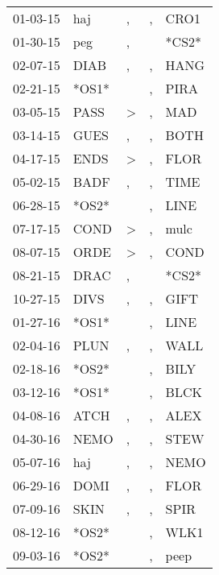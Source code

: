 \begin{supertabular}{lllll}
 01-03-15 &    haj &                , &                , &   CRO1 \\
 01-30-15 &    peg &                , &                  &  *CS2* \\
 02-07-15 &   DIAB &                , &                , &   HANG \\
 02-21-15 &  *OS1* &                  &                , &   PIRA \\
 03-05-15 &   PASS &     \textgreater &                , &    MAD \\
 03-14-15 &   GUES &                , &                , &   BOTH \\
 04-17-15 &   ENDS &     \textgreater &                , &   FLOR \\
 05-02-15 &   BADF &                , &                , &   TIME \\
 06-28-15 &  *OS2* &                  &                , &   LINE \\
 07-17-15 &   COND &     \textgreater &                , &   mulc \\
 08-07-15 &   ORDE &     \textgreater &                , &   COND \\
 08-21-15 &   DRAC &                , &                  &  *CS2* \\
 10-27-15 &   DIVS &                , &                , &   GIFT \\
 01-27-16 &  *OS1* &                  &                , &   LINE \\
 02-04-16 &   PLUN &                , &                , &   WALL \\
 02-18-16 &  *OS2* &                  &                , &   BILY \\
 03-12-16 &  *OS1* &                  &                , &   BLCK \\
 04-08-16 &   ATCH &                , &                , &   ALEX \\
 04-30-16 &   NEMO &                , &                , &   STEW \\
 05-07-16 &    haj &                , &                , &   NEMO \\
 06-29-16 &   DOMI &                , &                , &   FLOR \\
 07-09-16 &   SKIN &                , &                , &   SPIR \\
 08-12-16 &  *OS2* &                  &                , &   WLK1 \\
 09-03-16 &  *OS2* &                  &                , &   peep \\

\end{supertabular}
